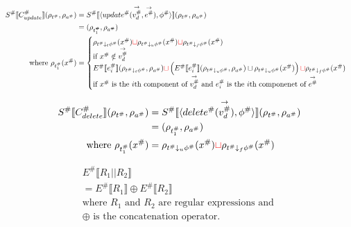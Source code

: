 \begin{align*}
    S^\# \llbracket C^\#_{update} \rrbracket(\rho_{t^\#}, \rho_{a^\#})
                                              & = S^\# \llbracket \langle update^\#(\overset{\rightarrow}{v_d^\#}, \overset{\rightarrow}{e^\#}), \phi^\# \rangle \rrbracket (\rho_{t^\#}, \rho_{a^\#}) \\
                                              & = (\rho_{t^\#_1}, \rho_{a^\#})                                                                 \\
    \text{where } \rho_{t^\#_1}(x^\#) & =
    \begin{cases}
        \rho_{t^\# \downarrow_t \phi^\#}(x^\#) \textcolor{red}{\sqcup} \rho_{t^\# \downarrow_u \phi^\#}(x^\#) \textcolor{red}{\sqcup} \rho_{t^\# \downarrow_f \phi^\#}(x^\#)                             \\
        \text{if } x^\# \notin \overset{\rightarrow}{v_d^\#}                                                                                                                                                                                        \\
        E^\# \llbracket e^\#_{i} \rrbracket(\rho_{t^\# \downarrow_t \phi^\#}, \rho_{a^\#}) \textcolor{red}{\sqcup}
        \left( E^\# \llbracket e^\#_{i} \rrbracket(\rho_{t^\# \downarrow_u \phi^\#}, \rho_{a^\#}) \sqcup \rho_{t^\# \downarrow_u \phi^\#}(x^\#) \right) \textcolor{red}{\sqcup} \rho_{t^\# \downarrow_f \phi^\#}(x^\#) \\
        \text{if $x^\#$ is the $i$th component of $\overset{\rightarrow}{v_d^\#}$ and $e^\#_{i}$ is the $i$th componenet of $\overset{\rightarrow}{e^\#}$}                                                                                                           \\
    \end{cases}
\end{align*}

\begin{align*}
    S^\# \llbracket C^\#_{delete} \rrbracket(\rho_{t^\#}, \rho_{a^\#})
    &= S^\# \llbracket \langle delete^\#(\overset{\rightarrow}{v_d^\#}), \phi^\# \rangle \rrbracket (\rho_{t^\#}, \rho_{a^\#}) \\
    &= (\rho_{t^\#_1}, \rho_{a^\#}) \\
    \text{where } \rho_{t^\#_1}(x^\#) &= \rho_{t^\# \downarrow_u \phi^\#}(x^\#) \textcolor{red}{\sqcup} \rho_{t^\# \downarrow_f \phi^\#}(x^\#)
\end{align*}

\begin{align*}
    E^\# \llbracket R_1 \texttt{||} R_2 \rrbracket                          \\
    = E^\# \llbracket R_1 \rrbracket \oplus  E^\# \llbracket R_2 \rrbracket \\
    \text{where } R_1 \text{ and } R_2 \text{ are regular expressions and } \\
    \oplus \text{ is the concatenation operator.}
\end{align*}

